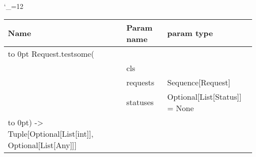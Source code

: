\begingroup \catcode`\_=12 \tt
\begin{tabular}{lll}
\toprule
\textrm{Name}&\textrm{Param name}&\textrm{param type}\\
\midrule
\hbox to 0pt {Request.testsome(\hss}\\
& cls\\
& requests & Sequence[Request]\\
& statuses & Optional[List[Status]] = None\\
\hbox to 0pt{) -> Tuple[Optional[List[int]], Optional[List[Any]]]\hss}\\
\bottomrule
\end{tabular}
\endgroup
